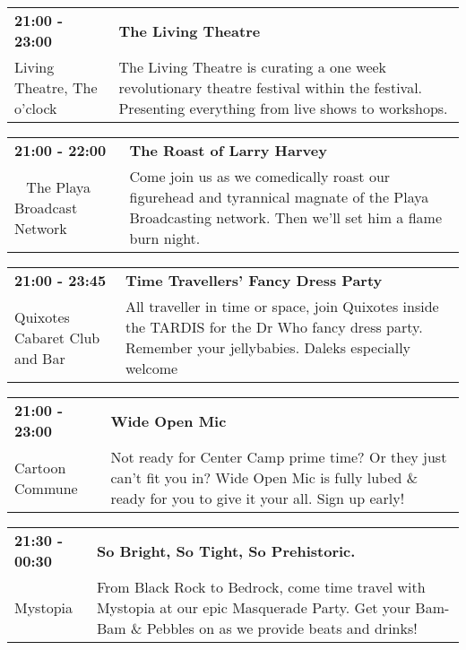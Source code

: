 \begin{tabular}{ p{1in} p{2.2in} }
    \textbf{21:00 - 23:00} & \textbf{The Living Theatre} \\
    Living Theatre, The \newline 6 o'clock & The Living Theatre is curating a one week revolutionary theatre festival within the festival. Presenting everything from live shows to workshops. \\
    \hline 
\end{tabular}
    
\begin{tabular}{ p{1in} p{2.2in} }
    \textbf{21:00 - 22:00} & \textbf{The Roast of Larry Harvey} \\
    ~ \newline The Playa Broadcast Network & Come join us as we comedically roast our figurehead and tyrannical magnate of the Playa Broadcasting network. Then we'll set him a flame burn night. \\
    \hline 
\end{tabular}
    
\begin{tabular}{ p{1in} p{2.2in} }
    \textbf{21:00 - 23:45} & \textbf{Time Travellers' Fancy Dress Party} \\
    Quixotes Cabaret Club and Bar \newline  & All traveller in time or space, join Quixotes inside the TARDIS for the Dr Who fancy dress party. Remember your jellybabies. Daleks especially welcome \\
    \hline 
\end{tabular}
    
\begin{tabular}{ p{1in} p{2.2in} }
    \textbf{21:00 - 23:00} & \textbf{Wide Open Mic} \\
    Cartoon Commune \newline  & Not ready for Center Camp prime time? Or they just can't fit you in? Wide Open Mic is fully lubed \& ready for you to give it your all. Sign up early! \\
    \hline 
\end{tabular}
    
\begin{tabular}{ p{1in} p{2.2in} }
    \textbf{21:30 - 00:30} & \textbf{So Bright, So Tight, So Prehistoric.} \\
    Mystopia \newline  & From Black Rock to Bedrock, come time travel with Mystopia at our epic Masquerade Party. Get your Bam-Bam \& Pebbles on as we provide beats and drinks! \\
    \hline 
\end{tabular}
    

